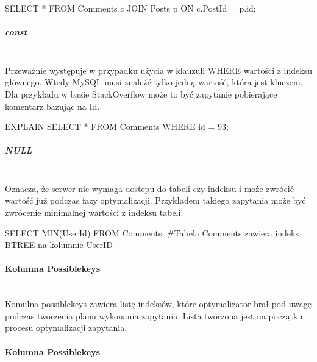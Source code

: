 \begin{spverbatim}
	SELECT * FROM Comments c JOIN Posts p ON c.PostId = p.id;
\end{spverbatim}

\subparagraph{const}\leavevmode\\
Przeważnie występuje w przypadku użycia w klauzuli WHERE wartości z indeksu głównego. Wtedy MySQL musi znaleźć tylko jedną wartość, która jest kluczem. Dla przykładu w bazie StackOverflow może to być zapytanie pobierające komentarz bazując na Id.
\begin{spverbatim}
	EXPLAIN SELECT * FROM Comments WHERE id = 93;
\end{spverbatim}

\subparagraph{NULL}\leavevmode\\
Oznacza, że serwer nie wymaga dostepu do tabeli czy indeksu i może zwrócić wartość już podczas fazy optymalizacji. Przykładem takiego zapytania może być zwrócenie minimalnej wartości z indeksu tabeli.

\begin{spverbatim}
	SELECT MIN(UserId) FROM Comments;
	#Tabela Comments zawiera indeks BTREE na kolumnie UserID
\end{spverbatim}

\paragraph{Kolumna Possible\textunderscore keys}\leavevmode\\

Komulna possible\textunderscore keys zawiera listę indeksów, które optymalizator brał pod uwagę podczas tworzenia planu wykonania zapytania. Lista tworzona jest na początku procesu optymalizacji zapytania.

\paragraph{Kolumna Possible\textunderscore keys}\leavevmode\\
